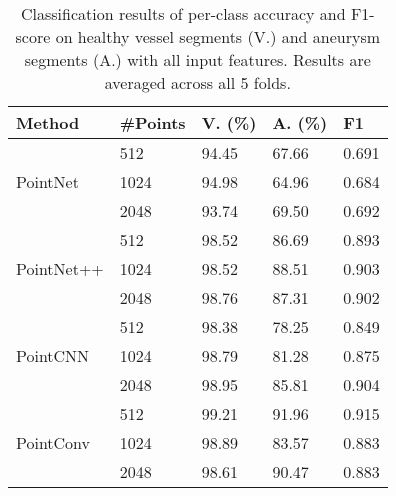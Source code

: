 \documentclass[10pt,twocolumn,letterpaper]{article}
\begin{document}
\begin{table} 
\small
\centering
\caption{Classification results of per-class accuracy and F1-score on healthy vessel segments (V.) and aneurysm segments (A.) with all input features. Results are averaged across all 5 folds.} \label{intra_cls}
\begin{tabular}{l|llll} 
\toprule
Method                    & \#Points & V. (\%) & A. (\%) & F1      \\ 

\hline
\multirow{3}{*}{PointNet \cite{qi2017pointnet}}   & \cellcolor{Apricot}512      & \cellcolor{Apricot}94.45   & \cellcolor{Apricot}67.66   & \cellcolor{Apricot}0.691  \\
                            & 1024     & 94.98   & 64.96   & 0.684  \\
                            & \cellcolor{Lavender}2048     & \cellcolor{Lavender}93.74   & \cellcolor{Lavender}69.50    & \cellcolor{Lavender}0.692  \\ 
\hline
\multirow{3}{*}{PointNet++ \cite{qi2017pointnet2}} & \cellcolor{Apricot}512      & \cellcolor{Apricot}98.52   & \cellcolor{Apricot}86.69   & \cellcolor{Apricot}0.893  \\
                            & 1024     & 98.52   & 88.51   & 0.903  \\
                            & \cellcolor{Lavender}2048     & \cellcolor{Lavender}98.76   & \cellcolor{Lavender}87.31   & \cellcolor{Lavender}0.902  \\
\hline
\multirow{3}{*}{PointCNN \cite{pointcnn}}   & \cellcolor{Apricot}512      & \cellcolor{Apricot}98.38   & \cellcolor{Apricot}78.25   & \cellcolor{Apricot}0.849  \\
                            & 1024     & 98.79   & 81.28   & 0.875  \\
                            & \cellcolor{Lavender}2048     & \cellcolor{Lavender}98.95   & \cellcolor{Lavender}85.81   & \cellcolor{Lavender}0.904  \\ 
\hline
\multirow{3}{*}{PointConv \cite{wu2019pointconv}}
                            & \cellcolor{Apricot}512      & \cellcolor{Apricot}99.21   & \cellcolor{Apricot}91.96   & \cellcolor{Apricot}0.915  \\
                            & 1024     & 98.89   & 83.57   & 0.883  \\
                            & \cellcolor{Lavender}2048     & \cellcolor{Lavender}98.61   & \cellcolor{Lavender}90.47   & \cellcolor{Lavender}0.883  \\ 

\end{tabular}
\end{table}
\end{document}
